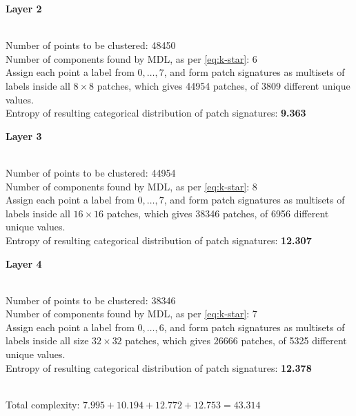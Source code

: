 \noindent \begin{large} \textbf{Layer 2} \end{large} \\
Number of points to be clustered: 48450 \\
Number of components found by MDL, as per \eqref{eq:k-star}: 6 \\
Assign each point a label from $0, \dots, 7$, and form patch signatures as multisets of labels inside all $8 \times 8$ patches, which gives 44954 patches, of 3809 different unique values. \\
Entropy of resulting categorical distribution of patch signatures: \textbf{9.363} \\

\noindent \begin{large} \textbf{Layer 3} \end{large} \\
Number of points to be clustered: 44954 \\
Number of components found by MDL, as per \eqref{eq:k-star}: 8 \\
Assign each point a label from $0, \dots, 7$, and form patch signatures as multisets of labels inside all $16 \times 16$ patches, which gives 38346 patches, of 6956 different unique values. \\
Entropy of resulting categorical distribution of patch signatures: \textbf{12.307} \\

\noindent \begin{large} \textbf{Layer 4} \end{large} \\
Number of points to be clustered: 38346 \\
Number of components found by MDL, as per \eqref{eq:k-star}: 7 \\
Assign each point a label from $0, \dots, 6$, and form patch signatures as multisets of labels inside all size $32 \times 32$ patches, which gives 26666 patches, of 5325 different unique values. \\
Entropy of resulting categorical distribution of patch signatures: \textbf{12.378} \\
\\
\begin{large}
Total complexity: $7.995 + 10.194 + 12.772 + 12.753 = \boldsymbol{43.314}$
\\
\end{large}



